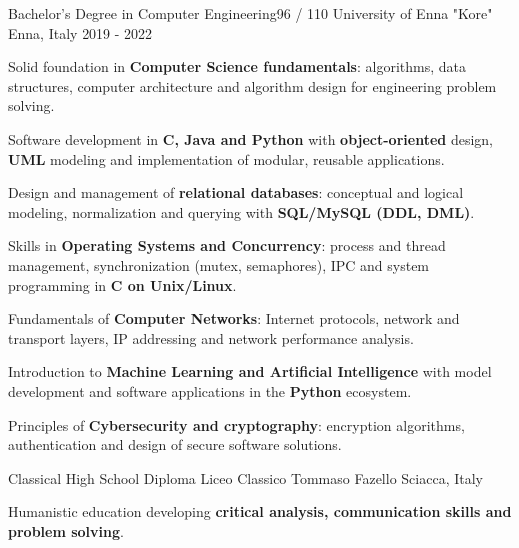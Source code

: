 \begin{cventries}
  \cventry
    {Bachelor's Degree in Computer Engineering{\enskip\cdotp\enskip}96 / 110}
    {University of Enna "Kore"}
    {Enna, Italy}
    {2019 - 2022}
    {
      \begin{cvitems}
        \item {Solid foundation in \textbf{Computer Science fundamentals}: algorithms, data structures, computer architecture and algorithm design for engineering problem solving.}
        \item {Software development in \textbf{C, Java and Python} with \textbf{object-oriented} design, \textbf{UML} modeling and implementation of modular, reusable applications.}
        \item {Design and management of \textbf{relational databases}: conceptual and logical modeling, normalization and querying with \textbf{SQL/MySQL (DDL, DML)}.}
        \item {Skills in \textbf{Operating Systems and Concurrency}: process and thread management, synchronization (mutex, semaphores), IPC and system programming in \textbf{C on Unix/Linux}.}
        \item {Fundamentals of \textbf{Computer Networks}: Internet protocols, network and transport layers, IP addressing and network performance analysis.}
        \item {Introduction to \textbf{Machine Learning and Artificial Intelligence} with model development and software applications in the \textbf{Python} ecosystem.}
        \item {Principles of \textbf{Cybersecurity and cryptography}: encryption algorithms, authentication and design of secure software solutions.}
        \\
      \end{cvitems}
    }
  \cventry
    {Classical High School Diploma}
    {Liceo Classico Tommaso Fazello}
    {Sciacca, Italy}
    {}
    {
      \begin{cvitems}
        \item {Humanistic education developing \textbf{critical analysis, communication skills and problem solving}.}
        \\
      \end{cvitems}
    }

\end{cventries}
